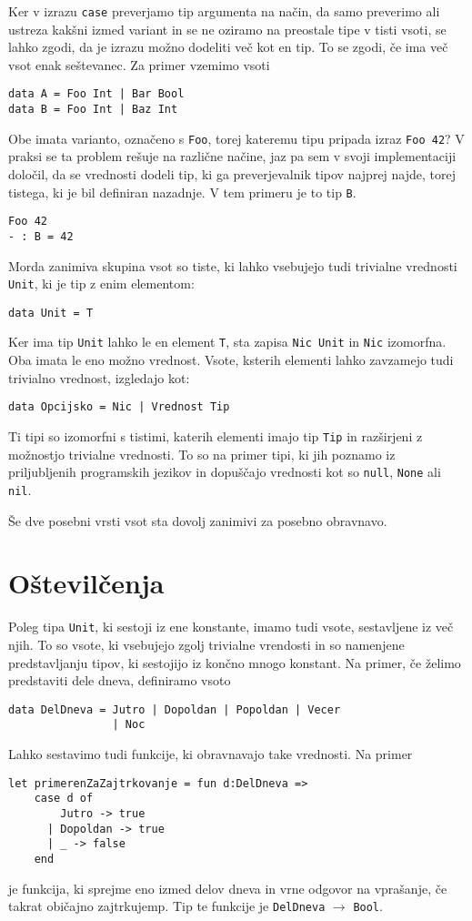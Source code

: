 \documentclass[12pt,a4paper,openany]{book}
\begin{document}
Ker v izrazu \lstinline{case} preverjamo tip argumenta na način, da samo preverimo ali ustreza kakšni izmed variant in se ne oziramo na preostale tipe v tisti vsoti, 
se lahko zgodi, da je izrazu možno dodeliti več kot en tip. To se zgodi, če ima več vsot enak seštevanec. Za primer vzemimo vsoti
\begin{lstlisting}
data A = Foo Int | Bar Bool
data B = Foo Int | Baz Int
\end{lstlisting}
Obe imata varianto, označeno s \lstinline{Foo}, torej kateremu tipu pripada izraz \lstinline{Foo 42}? V praksi se ta problem rešuje na različne načine, jaz pa sem v svoji implementaciji določil, da se vrednosti 
dodeli tip, ki ga preverjevalnik tipov najprej najde, torej tistega, ki je bil definiran nazadnje. V tem primeru je to tip \lstinline{B}.
\begin{lstlisting}
Foo 42
- : B = 42
\end{lstlisting}

Morda zanimiva skupina vsot so tiste, ki lahko vsebujejo tudi trivialne vrednosti \lstinline{Unit}, ki je tip z enim elementom:
\begin{lstlisting}
data Unit = T
\end{lstlisting}
Ker ima tip \lstinline{Unit} lahko le en element \lstinline{T}, sta zapisa \lstinline{Nic Unit} in \lstinline{Nic} izomorfna. Oba imata le eno možno vrednost. Vsote, ksterih elementi lahko zavzamejo tudi trivialno vrednost, izgledajo kot:
\begin{lstlisting}
data Opcijsko = Nic | Vrednost Tip
\end{lstlisting}
Ti tipi so izomorfni s tistimi, katerih elementi imajo tip \lstinline{Tip} in razširjeni z možnostjo trivialne vrednosti. To so na primer tipi, ki jih poznamo iz priljubljenih programskih jezikov in dopuščajo 
vrednosti kot so \lstinline{null}, \lstinline{None} ali \lstinline{nil}.

Še dve posebni vrsti vsot sta dovolj zanimivi za posebno obravnavo.

\section{Oštevilčenja}
Poleg tipa \lstinline{Unit}, ki sestoji iz ene konstante, imamo tudi vsote, sestavljene iz več njih. To so vsote, ki vsebujejo zgolj trivialne vrendosti in so namenjene predstavljanju tipov, ki sestojijo iz končno mnogo konstant. 
Na primer, če želimo predstaviti dele dneva, definiramo vsoto
\begin{lstlisting}
data DelDneva = Jutro | Dopoldan | Popoldan | Vecer 
                | Noc
\end{lstlisting}
Lahko sestavimo tudi funkcije, ki obravnavajo take vrednosti. Na primer
\begin{lstlisting}
let primerenZaZajtrkovanje = fun d:DelDneva =>
    case d of 
        Jutro -> true
      | Dopoldan -> true
      | _ -> false
    end
\end{lstlisting}
je funkcija, ki sprejme eno izmed delov dneva in vrne odgovor na vprašanje, če takrat običajno zajtrkujemp. Tip te funkcije je \lstinline{DelDneva} $\rightarrow$ \lstinline{Bool}.
\end{document}
